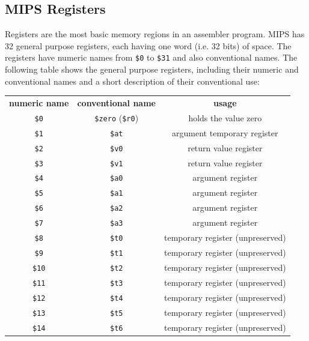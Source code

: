 \documentclass[12pt]{article}
\begin{document}
\subsection{MIPS Registers}

Registers are the most basic memory regions in an assembler program. MIPS has 32
     general purpose registers, each having one word (i.e. 32 bits) of
     space. The registers have numeric names from \texttt{\$0} to \texttt{\$31}
     and also conventional names. The following table shows the general purpose
     registers, including their numeric and conventional names and a short
     description of their conventional use:\\

\begin{tabular}{c | c | c}
    \textbf{numeric name} & \textbf{conventional name} & \textbf{usage}\\
    \hhline{=|=|=}
    \texttt{\$0} & \texttt{\$zero} (\texttt{\$r0}) & holds the value zero \\ \hline
    \texttt{\$1} & \texttt{\$at} & argument temporary register \\ \hline
    \texttt{\$2} & \texttt{\$v0} & return value register \\ \hline
    \texttt{\$3} & \texttt{\$v1} & return value register \\ \hline
    \texttt{\$4} & \texttt{\$a0} & argument register \\ \hline
    \texttt{\$5} & \texttt{\$a1} & argument register \\ \hline
    \texttt{\$6} & \texttt{\$a2} & argument register \\ \hline
    \texttt{\$7} & \texttt{\$a3} & argument register \\ \hline
    \texttt{\$8} & \texttt{\$t0} & temporary register (unpreserved) \\ \hline
    \texttt{\$9} & \texttt{\$t1} & temporary register (unpreserved) \\ \hline
    \texttt{\$10} & \texttt{\$t2} & temporary register (unpreserved) \\ \hline
    \texttt{\$11} & \texttt{\$t3} & temporary register (unpreserved) \\ \hline
    \texttt{\$12} & \texttt{\$t4} & temporary register (unpreserved) \\ \hline
    \texttt{\$13} & \texttt{\$t5} & temporary register (unpreserved) \\ \hline
    \texttt{\$14} & \texttt{\$t6} & temporary register (unpreserved) \\ \hline

\end{tabular}
\end{document}
